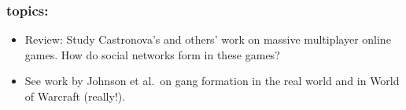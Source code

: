 



\begin{frame}
  \frametitle{topics:}

  \begin{block}{}
  \begin{itemize}
  \item
    Review: Study Castronova's and others'
    work on massive multiplayer online games.  
    How do social networks
    form in these games?\cite{castronova2005a}
  \item
    See work by Johnson et al.\ on gang formation
    in the real world and in World of Warcraft (really!).
  \end{itemize}
  \end{block}

\end{frame}


